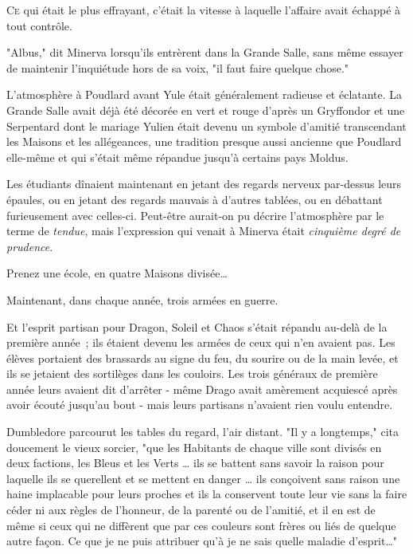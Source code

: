 

\lettrine{C}{e} qui était le plus effrayant, c'était la vitesse à laquelle l'affaire avait échappé à tout contrôle.

"Albus," dit Minerva lorsqu'ils entrèrent dans la Grande Salle, sans même essayer de maintenir l'inquiétude hors de sa voix, "il faut faire quelque chose."

L'atmosphère à Poudlard avant Yule était généralement radieuse et éclatante. La Grande Salle avait déjà été décorée en vert et rouge d'après un Gryffondor et une Serpentard dont le mariage Yulien était devenu un symbole d'amitié transcendant les Maisons et les allégeances, une tradition presque aussi ancienne que Poudlard elle-même et qui s'était même répandue jusqu'à certains pays Moldus.

Les étudiants dînaient maintenant en jetant des regards nerveux par-dessus leurs épaules, ou en jetant des regards mauvais à d'autres tablées, ou en débattant furieusement avec celles-ci. Peut-être aurait-on pu décrire l'atmosphère par le terme de \emph{tendue}, mais l'expression qui venait à Minerva était \emph{cinquième degré de prudence}.

Prenez une école, en quatre Maisons divisée…

Maintenant, dans chaque année, trois armées en guerre.

Et l'esprit partisan pour Dragon, Soleil et Chaos s'était répandu au-delà de la première année~; ils étaient devenu les armées de ceux qui n'en avaient pas. Les élèves portaient des brassards au signe du feu, du sourire ou de la main levée, et ils se jetaient des sortilèges dans les couloirs. Les trois généraux de première année leurs avaient dit d'arrêter - même Drago avait amèrement acquiescé après avoir écouté jusqu'au bout - mais leurs partisans n'avaient rien voulu entendre.

Dumbledore parcourut les tables du regard, l'air distant. "Il y a longtemps," cita doucement le vieux sorcier, "que les Habitants de chaque ville sont divisés en deux factions, les Bleus et les Verts … ils se battent sans savoir la raison pour laquelle ils se querellent et se mettent en danger … ils conçoivent sans raison une haine implacable pour leurs proches et ils la conservent toute leur vie sans la faire céder ni aux règles de l'honneur, de la parenté ou de l'amitié, et il en est de même si ceux qui ne diffèrent que par ces couleurs sont frères ou liés de quelque autre façon. Ce que je ne puis attribuer qu'à je ne sais quelle maladie d'esprit…"


